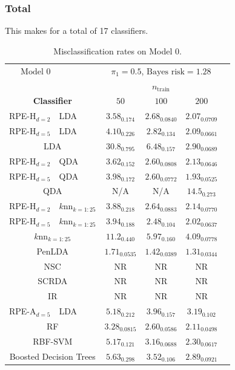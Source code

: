 \documentclass{amsart}
\providecommand{\tabularnewline}{\\}
\begin{document}
\subsubsection{Total}

This makes for a total of 17 classifiers.








\begin{table}[p]
	\begin{centering}
		\begin{tabular}{r|l|c|c|c|c}
			\multicolumn{1}{r}{$\boxed{\text{Model 0}}$} & \multicolumn{1}{l}{} & \multicolumn{3}{c}{$\pi_{1}=0.5$, $\text{Bayes risk}=1.28$} & \tabularnewline
			\multicolumn{1}{r}{} &  & \multicolumn{3}{c|}{$n_{\mathrm{train}}$} & \tabularnewline
			\multicolumn{2}{c|}{\textbf{Classifier}} & $50$ & $100$ & $200$ & \tabularnewline
			\hline 
			RPE-H$_{d=2}$ & LDA & $3.58_{0.174}$ & $2.68_{0.0840}$ & $2.07_{0.0709}$ & \tabularnewline
			\hline 
			RPE-H$_{d=5}$ & LDA & $4.10_{0.226}$ & $2.82_{0.134}$ & $2.09_{0.0661}$ & \tabularnewline
			\hline 
			\multicolumn{2}{c|}{LDA} & $30.8_{0.795}$ & $6.48_{0.157}$ & $2.90_{0.0689}$ & \tabularnewline
			\hline 
			RPE-H$_{d=2}$ & QDA & $3.62_{0.152}$ & $2.60_{0.0808}$ & $2.13_{0.0646}$ & \tabularnewline
			\hline 
			RPE-H$_{d=5}$ & QDA & $3.98_{0.172}$ & $2.60_{0.0772}$ & $1.93_{0.0525}$ & \tabularnewline
			\hline 
			\multicolumn{2}{c|}{QDA} & N/A & N/A & $14.5_{0.273}$ & \tabularnewline
			\hline 
			RPE-H$_{d=2}$ & $k$nn$_{k=1:25}$ & $3.88_{0.218}$ & $2.64_{0.0883}$ & $2.14_{0.0770}$ & \tabularnewline
			\hline 
			RPE-H$_{d=5}$ & $k$nn$_{k=1:25}$ & $3.94_{0.188}$ & $2.48_{0.104}$ & $2.02_{0.0637}$ & \tabularnewline
			\hline 
			\multicolumn{2}{c|}{$k$nn$_{k=1:25}$} & $11.2_{0.440}$ & $5.97_{0.160}$ & $4.09_{0.0778}$ & \tabularnewline
			\hline 
			\hline 
			\multicolumn{2}{c|}{PenLDA} & $\mathbf{1.71_{0.0535}}$ & $\mathbf{1.42_{0.0389}}$ & $\mathbf{1.31_{0.0344}}$ & \tabularnewline
			\hline 
			\multicolumn{2}{c|}{NSC} & NR & NR & NR & \tabularnewline
			\hline 
			\multicolumn{2}{c|}{SCRDA} & NR & NR & NR & \tabularnewline
			\hline 
			\multicolumn{2}{c|}{IR} & NR & NR & NR & \tabularnewline
			\hline 
			\hline 
			RPE-A$_{d=5}$ & LDA & $5.18_{0.212}$ & $3.96_{0.157}$ & $3.19_{0.102}$ & \tabularnewline
			\hline 
			\hline 
			\multicolumn{2}{c|}{RF} & $3.28_{0.0815}$ & $2.60_{0.0586}$ & $2.11_{0.0498}$ & \tabularnewline
			\hline 
			\multicolumn{2}{c|}{RBF-SVM} & $5.17_{0.121}$ & $3.16_{0.0688}$ & $2.30_{0.0617}$ & \tabularnewline
			\hline 
			\multicolumn{2}{c|}{Boosted Decision Trees} & $5.63_{0.298}$ & $3.52_{0.106}$ & $2.89_{0.0921}$ & \tabularnewline
		\end{tabular}\\
		
		\par\end{centering}
	
	\protect\caption{Misclassification rates on Model 0.}
	\label{tab:model-0}
\end{table}
\end{document}
